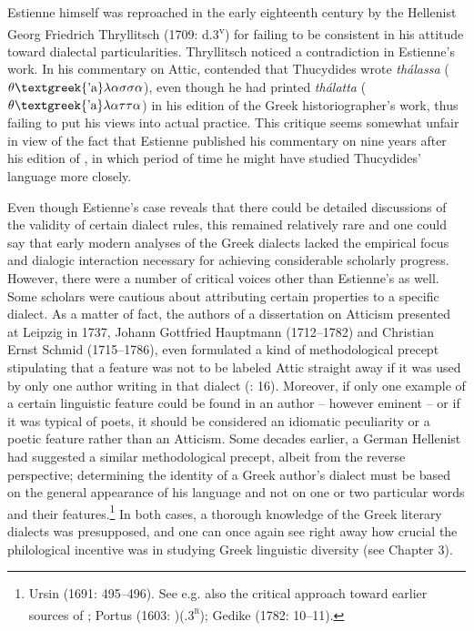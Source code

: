 Estienne himself was reproached in the early eighteenth century by the Hellenist Georg Friedrich Thryllitsch (1709: d.3\textsuperscript{v}) for failing to be consistent in his attitude toward dialectal particularities. Thryllitsch noticed a contradiction in Estienne’s work. In his commentary on Attic, \citet[13]{Estienne1573} contended that Thucydides wrote \textit{thálassa} ($\theta \text{\textgreek{'a}}\lambda \alpha \sigma \sigma \alpha $), even though he had printed \textit{thálatta} ($\theta \text{\textgreek{'a}}\lambda \alpha \tau \tau \alpha $) in his edition of the Greek historiographer’s work, thus failing to put his views into actual practice. This critique seems somewhat unfair in view of the fact that Estienne published his commentary on \citet{Attic1573} nine years after his edition of \citet{Thucydides1564}, in which period of time he might have studied Thucydides’ language more closely.

Even though Estienne’s case reveals that there could be detailed discussions of the validity of certain dialect rules, this remained relatively rare and one could say that early modern analyses of the Greek dialects lacked the empirical focus and dialogic interaction necessary for achieving considerable scholarly progress. However, there were a number of critical voices other than Estienne’s as well. Some scholars were cautious about attributing certain properties to a specific dialect. As a matter of fact, the authors of a dissertation on Atticism presented at Leipzig in 1737, Johann Gottfried Hauptmann (1712–1782) and Christian Ernst Schmid (1715–1786), even formulated a kind of methodological precept stipulating that a feature was not to be labeled Attic straight away if it was used by only one author writing in that dialect (\citealt{HauptmannSchmid1737}: 16). Moreover, if only one example of a certain linguistic feature could be found in an author – however eminent – or if it was typical of poets, it should be considered an idiomatic peculiarity or a poetic feature rather than an Atticism. Some decades earlier, a German Hellenist had suggested a similar methodological precept, albeit from the reverse perspective; determining the identity of a Greek author’s dialect must be based on the general appearance of his language and not on one or two particular words and their features.\footnote{Ursin (1691: 495–496). See e.g. also the critical approach toward earlier sources of \citet{Walper1589}; Portus (1603: )(.3\textsc{\textsuperscript{r}}); Gedike (1782: 10–11).} In both cases, a thorough knowledge of the Greek literary dialects was presupposed, and one can once again see right away how crucial the philological incentive was in studying Greek linguistic diversity (see Chapter 3).

